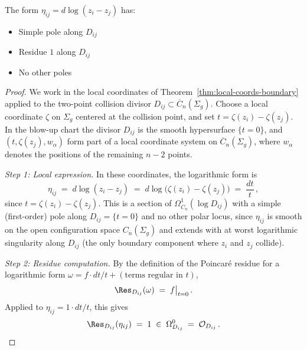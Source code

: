 \begin{lemma}\label{lem:basic-log-form-residue}
The form $\eta_{ij} = d\log(z_i - z_j)$ has:
\begin{itemize}
\item Simple pole along $D_{ij}$
\item Residue $1$ along $D_{ij}$
\item No other poles
\end{itemize}
\end{lemma}

\begin{proof}
We work in the local coordinates of Theorem~\ref{thm:local-coords-boundary}
applied to the two-point collision divisor $D_{ij}\subset\overline{C}_n(\Sigma_g)$.
Choose a local coordinate $\zeta$ on $\Sigma_g$ centered at the collision
point, and set $t = \zeta(z_i) - \zeta(z_j)$.  In the blow-up chart the
divisor $D_{ij}$ is the smooth hypersurface $\{t = 0\}$, and $(t, \zeta(z_j),
w_\alpha)$ form part of a local coordinate system on $\overline{C}_n(\Sigma_g)$,
where $w_\alpha$ denotes the positions of the remaining $n-2$ points.

\medskip
\noindent\emph{Step 1: Local expression.}
In these coordinates, the logarithmic form is
\[
\eta_{ij} \;=\; d\log(z_i - z_j) \;=\; d\log\!\bigl(\zeta(z_i)-\zeta(z_j)\bigr)
\;=\; \frac{dt}{t}\,,
\]
since $t = \zeta(z_i) - \zeta(z_j)$.  This is a section of
$\Omega^1_{\overline{C}_n}(\log D_{ij})$ with a simple (first-order) pole along
$D_{ij} = \{t=0\}$ and no other polar locus, since $\eta_{ij}$ is smooth on the
open configuration space $C_n(\Sigma_g)$ and extends with at worst logarithmic
singularity along $D_{ij}$ (the only boundary component where $z_i$ and $z_j$ collide).

\medskip
\noindent\emph{Step 2: Residue computation.}
By the definition of the Poincar\'e residue for a logarithmic form
$\omega = f \cdot dt/t + (\text{terms regular in } t)$,
\[
\Res_{D_{ij}}(\omega) \;=\; f\big|_{t=0}\,.
\]
Applied to $\eta_{ij} = 1 \cdot dt/t$, this gives
\[
\Res_{D_{ij}}(\eta_{ij}) \;=\; 1 \;\in\; \Omega^0_{D_{ij}}
\;=\; \mathcal{O}_{D_{ij}}\,.
\]


\end{proof}
